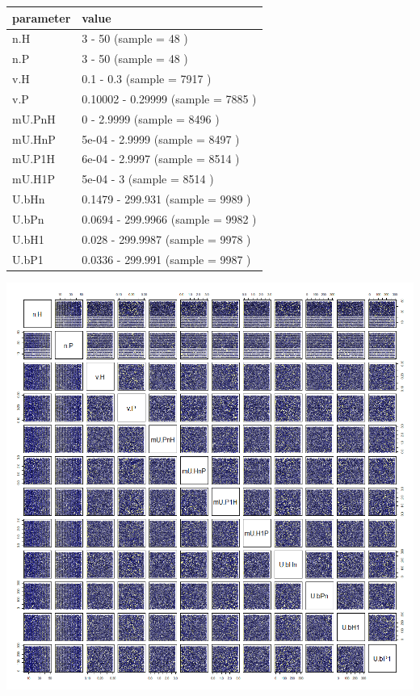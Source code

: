 \documentclass[]{book}
\begin{document}
\begin{tabular}{l|l}
\hline
parameter & value\\
\hline
n.H & 3 - 50 (sample = 48 )\\
\hline
n.P & 3 - 50 (sample = 48 )\\
\hline
v.H & 0.1 - 0.3 (sample = 7917 )\\
\hline
v.P & 0.10002 - 0.29999 (sample = 7885 )\\
\hline
mU.PnH & 0 - 2.9999 (sample = 8496 )\\
\hline
mU.HnP & 5e-04 - 2.9999 (sample = 8497 )\\
\hline
mU.P1H & 6e-04 - 2.9997 (sample = 8514 )\\
\hline
mU.H1P & 5e-04 - 3 (sample = 8514 )\\
\hline
U.bHn & 0.1479 - 299.931 (sample = 9989 )\\
\hline
U.bPn & 0.0694 - 299.9966 (sample = 9982 )\\
\hline
U.bH1 & 0.028 - 299.9987 (sample = 9978 )\\
\hline
U.bP1 & 0.0336 - 299.991 (sample = 9987 )\\
\hline
\end{tabular}

\newpage

\includegraphics[width=1\linewidth]{plots/5_multiplePar-LHC_pairs-plot}
\end{document}
